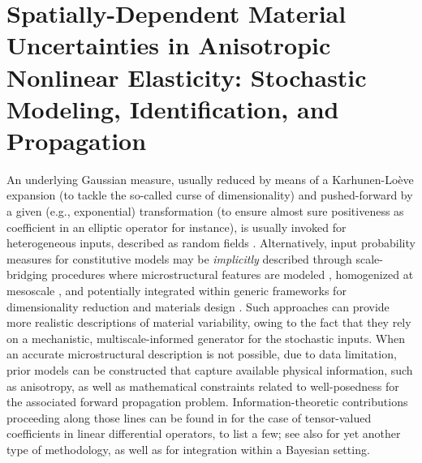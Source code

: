 \chapter{Spatially-Dependent Material Uncertainties in Anisotropic Nonlinear Elasticity: Stochastic Modeling, Identification, and Propagation}
\label{chap:artery}

An underlying Gaussian measure, usually reduced by means of a Karhunen-Lo\`{e}ve expansion (to tackle the so-called curse of dimensionality) and pushed-forward by a given (e.g., exponential) transformation (to ensure almost sure positiveness as coefficient in an elliptic operator for instance), is usually invoked for heterogeneous inputs, described as random fields \cite{Ghanem1991,Ghanem2017}. Alternatively, input probability measures for constitutive models may be \textit{implicitly} described through scale-bridging procedures where microstructural features are modeled \cite{Sobczyk,Torquato}, homogenized at mesoscale \cite{OstojaBook, ostoja1998, baxter2001a, baxter2001b, STEFANOU2017319}, and potentially integrated within generic frameworks for dimensionality reduction \cite{BESSA2017633} and materials design \cite{Yin2009}. Such approaches can provide more realistic descriptions of material variability, owing to the fact that they rely on a mechanistic, multiscale-informed generator for the stochastic inputs. When an accurate microstructural description is not possible, due to data limitation, prior models can be constructed that capture available physical information, such as anisotropy, as well as mathematical constraints related to well-posedness for the associated forward propagation problem. Information-theoretic contributions proceeding along those lines can be found in \cite{Soize2006,Guilleminot-IJNME-2017,Guilleminot-SIAM-2013,STABER2017399} for the case of tensor-valued coefficients in linear differential operators, to list a few; see also \cite{Grigoriu2016} for yet another type of methodology, as well as \cite{SOIZE2011} for integration within a Bayesian setting.

